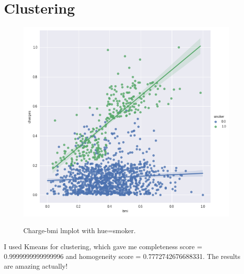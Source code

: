 \documentclass[12pt]{article}
\begin{document}
\part{Clustering}
\begin{figure}[H]
\centering
\includegraphics[width=\textwidth]{lmplot_bmi.png}
\label{mesh:fig1}
\caption{Charge-bmi lmplot with hue=smoker.}
\end{figure}
I used Kmeans for clustering, which gave me completeness score = 0.9999999999999996 and homogeneity score = 0.7772742676688331. The results are amazing actually!
\end{document}
